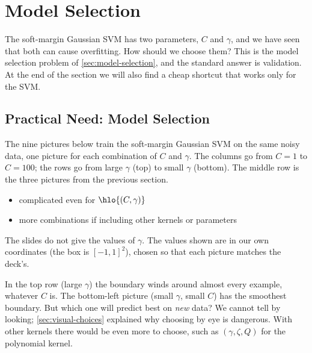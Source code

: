 \section{Model Selection}\label{sec:soft-model-selection}


The soft-margin Gaussian SVM has two parameters, \(C\) and \(\gamma\), and
we have seen that both can cause overfitting. How should we choose them? This
is the model selection problem of \autoref{sec:model-selection}, and the
standard answer is validation. At the end of the section we will also find a
cheap shortcut that works only for the SVM.

\subsection{Practical Need: Model Selection}

The nine pictures below train the soft-margin Gaussian SVM on the same noisy
data, one picture for each combination of \(C\) and \(\gamma\). The columns
go from \(C = 1\) to \(C = 100\); the rows go from large \(\gamma\) (top) to
small \(\gamma\) (bottom). The middle row is the three pictures from the
previous section.

\begin{center}
    \begin{minipage}[c]{0.56\textwidth}
        \centering
        \smsvmgrid{}{}{}{}{}{}{}{}{}
    \end{minipage}%
    \hfill
    \begin{minipage}[c]{0.4\textwidth}
        \begin{itemize}
            \item complicated even for \(\hlo{(C, \gamma)}\)
            \item more combinations if including other kernels or
                parameters
        \end{itemize}
    \end{minipage}
\end{center}

\begin{note}
    The slides do not give the values of \(\gamma\). The values shown are in
    our own coordinates (the box is \([-1, 1]^2\)), chosen so that each
    picture matches the deck's.
\end{note}

In the top row (large \(\gamma\)) the boundary winds around almost every
example, whatever \(C\) is. The bottom-left picture (small \(\gamma\), small
\(C\)) has the smoothest boundary. But which one will predict best on
\emph{new} data? We cannot tell by looking; \autoref{sec:visual-choices}
explained why choosing by eye is dangerous. With other kernels there would be
even more to choose, such as \((\gamma, \zeta, Q)\) for the polynomial
kernel.

